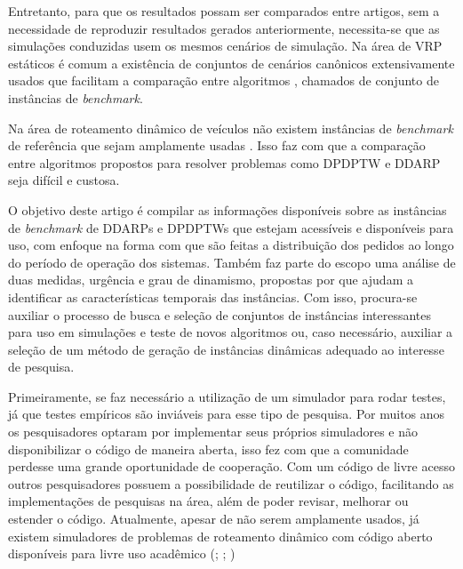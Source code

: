 Entretanto, para que os resultados possam ser comparados entre artigos, sem a
necessidade de reproduzir resultados gerados anteriormente,
necessita-se que as simulações conduzidas usem os mesmos cenários de 
simulação.
Na área de VRP estáticos é comum a existência de conjuntos de cenários
canônicos extensivamente usados que facilitam a comparação entre 
algoritmos \cite{mendoza_vrp-rep:_2014}, chamados de
conjunto de instâncias de \textit{benchmark}.

Na área de roteamento dinâmico de veículos não existem instâncias
de \textit{benchmark} de referência que sejam amplamente usadas 
\cite{pillac_review_2013, maciejewski_towards_2017}. 
Isso faz com que a comparação entre algoritmos
propostos para resolver problemas como DPDPTW e DDARP seja difícil e custosa.

O objetivo deste artigo é compilar as informações disponíveis sobre as
instâncias de \textit{benchmark} de DDARPs e DPDPTWs que estejam acessíveis e
disponíveis para uso, com enfoque na forma com que são feitas a distribuição
dos pedidos ao longo do período de operação dos sistemas.
Também faz parte do escopo uma análise de duas medidas, urgência e 
grau de dinamismo, propostas por  que ajudam 
a identificar as características temporais das instâncias. 
Com isso, procura-se auxiliar o processo de busca e seleção de conjuntos de 
instâncias interessantes para uso em simulações e teste de novos algoritmos ou,
caso necessário, auxiliar a seleção de um método de geração de instâncias
dinâmicas adequado ao interesse de pesquisa.

\iffalse
Primeiramente, se faz necessário a utilização de um simulador para rodar
testes, já que testes empíricos são inviáveis para esse tipo de pesquisa.
Por muitos anos os pesquisadores optaram por implementar seus próprios 
simuladores e não disponibilizar o código de maneira aberta, isso fez com que a
comunidade perdesse uma grande oportunidade de cooperação.
Com um código de livre acesso outros pesquisadores possuem a possibilidade de
reutilizar o código, facilitando as implementações de pesquisas na área, além
de poder revisar, melhorar ou estender o código. 
Atualmente, apesar de não serem amplamente usados, já existem simuladores de 
problemas de roteamento dinâmico com código aberto disponíveis para livre uso
acadêmico (\cite{van_lon_rinsim:_2012}; \cite{mayer_open-source_2016};
\cite{maciejewski_towards_2017})

